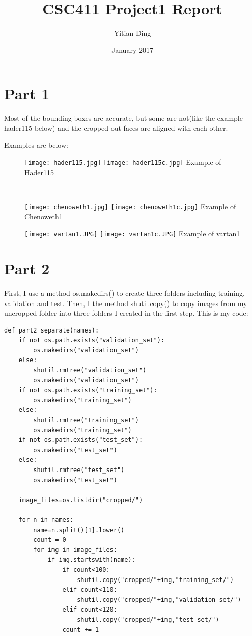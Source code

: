 \documentclass{article}
\title{CSC411 Project1 Report}
\author{Yitian Ding }
\date{January 2017}
\begin{document}
\maketitle
\clearpage
\section{Part 1}
Most of the bounding boxes are accurate, but some are not(like the example hader115 below) and the cropped-out faces are aligned with each other.

Examples are below:
\begin{figure}[ht!]
  \texttt{[image: hader115.jpg]} \hfill
  \texttt{[image: hader115c.jpg]}
  \newline Example of Hader115
\end{figure}\

\begin{figure}[ht!]
  \texttt{[image: chenoweth1.jpg]} \hfill
  \texttt{[image: chenoweth1c.jpg]}
  \newline Example of Chenoweth1
\end{figure}

\begin{figure}[ht!]
  \texttt{[image: vartan1.JPG]} \hfill
  \texttt{[image: vartan1c.JPG]}
  \newline Example of vartan1
\end{figure}

\clearpage



\section{Part 2}
First, I use a method os.makedirs() to create three folders including training, validation and test. 
Then, I the method shutil.copy() to copy images from my uncropped folder into three folders I created in the first step.
This is my code:
\begin{lstlisting}
def part2_separate(names):
    if not os.path.exists("validation_set"):
        os.makedirs("validation_set")
    else:
        shutil.rmtree("validation_set")
        os.makedirs("validation_set")
    if not os.path.exists("training_set"):        
        os.makedirs("training_set")
    else:
        shutil.rmtree("training_set")
        os.makedirs("training_set")
    if not os.path.exists("test_set"):
        os.makedirs("test_set")
    else:
        shutil.rmtree("test_set")
        os.makedirs("test_set")
    
    image_files=os.listdir("cropped/")
    
    for n in names:
        name=n.split()[1].lower()
        count = 0
        for img in image_files:
            if img.startswith(name):
                if count<100:
                    shutil.copy("cropped/"+img,"training_set/")
                elif count<110:
                    shutil.copy("cropped/"+img,"validation_set/")
                elif count<120:
                    shutil.copy("cropped/"+img,"test_set/")
                count += 1

\end{lstlisting}
\end{document}
